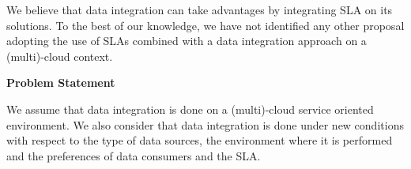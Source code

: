 \documentclass[12pt,a4paper,oneside]{report}
\begin{document}
%
%
%


We believe that data integration can take advantages by integrating SLA on its solutions. To the best of our knowledge, we have not identified any other proposal adopting the use of SLAs combined with a data integration approach on a (multi)-cloud context.

\begin{flushleft}
\textbf{Problem Statement}\\
\end{flushleft}

We assume that data integration is done on a (multi)-cloud service oriented environment. We also consider that data integration is done under new conditions with respect to the type of data sources, the environment where it is performed and the preferences  of data consumers and the SLA. 
\end{document}
